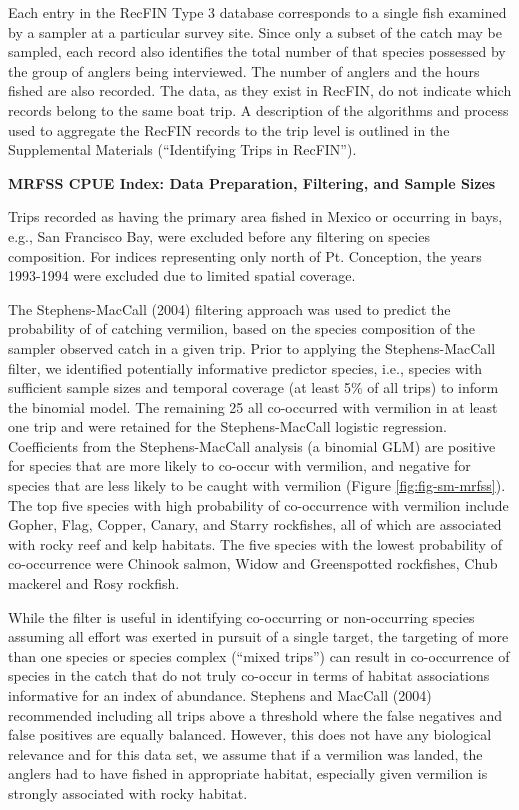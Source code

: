\documentclass[
  english,
  a4paper,
]{article}
\begin{document}
Each entry in the RecFIN Type 3 database corresponds to a
single fish examined by a sampler at a particular survey site. Since only a
subset of the catch may be sampled, each record also
identifies the total number of that species possessed by the group of anglers
being interviewed. The number of anglers and the hours fished are also recorded.
The data, as they exist in RecFIN, do not indicate which records
belong to the same boat trip. A description of the algorithms and process used to
aggregate the RecFIN records to the trip level is outlined in the Supplemental Materials
(``Identifying Trips in RecFIN'').

\textbf{MRFSS CPUE Index: Data Preparation, Filtering, and Sample Sizes}

Trips recorded as having the primary area fished in Mexico or occurring in bays, e.g.,
San Francisco Bay, were excluded before any filtering on species composition.
For indices representing only north of Pt. Conception, the years 1993-1994 were
excluded due to limited spatial coverage.

The Stephens-MacCall (2004) filtering approach was used to predict the
probability of of catching vermilion, based
on the species composition of the sampler observed catch in a given trip. Prior
to applying the Stephens-MacCall filter, we identified potentially informative
predictor species, i.e., species with sufficient sample sizes and temporal coverage
(at least 5\% of all trips) to inform the binomial model. The remaining
25 all co-occurred with vermilion in at least one trip
and were retained for the Stephens-MacCall logistic regression. Coefficients
from the Stephens-MacCall analysis (a binomial GLM) are positive
for species that are more likely to co-occur with vermilion,
and negative for species that are less likely to be caught with vermilion
(Figure \ref{fig:fig-sm-mrfss}).
The top five species with high probability of co-occurrence with vermilion include
Gopher, Flag, Copper, Canary, and Starry rockfishes, all of which are associated with rocky reef and kelp
habitats. The five species with the lowest probability of co-occurrence were
Chinook salmon, Widow and Greenspotted rockfishes, Chub mackerel and Rosy rockfish.

While the filter is useful in identifying co-occurring or non-occurring species
assuming all effort was exerted in pursuit of a single target, the targeting of
more than one species or species complex (``mixed trips'') can result in co-occurrence of species in the catch
that do not truly co-occur in terms of habitat
associations informative for an index of abundance. Stephens and MacCall
(2004) recommended including all trips above a threshold where the
false negatives and false positives are equally balanced. However, this does
not have any biological relevance and for this data set, we assume that if a
vermilion was landed, the anglers had to have fished in appropriate habitat,
especially given vermilion is strongly associated with rocky habitat.
\end{document}
